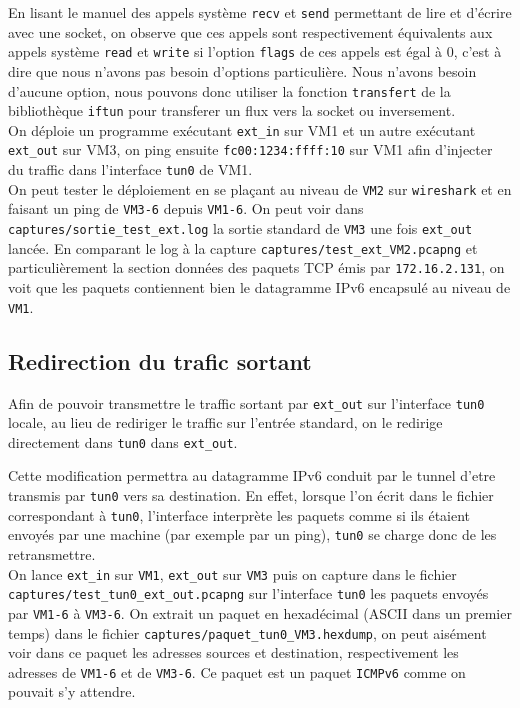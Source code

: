 \documentclass[a4paper, 10pt]{article}
\begin{document}
      En lisant le manuel des appels système \verb+recv+ et \verb+send+
      permettant de lire et d'écrire avec une socket, on observe que ces appels
      sont respectivement équivalents aux appels système \verb+read+ et
      \verb+write+ si l'option \verb+flags+ de ces appels est égal à 0, c'est à
      dire que nous n'avons pas besoin d'options particulière. Nous n'avons
      besoin d'aucune option, nous pouvons donc utiliser la fonction
      \verb+transfert+ de la bibliothèque \verb+iftun+ pour transferer un flux
      vers la socket ou inversement. \\

      On déploie un programme exécutant \verb+ext_in+ sur VM1 et un autre
      exécutant \verb+ext_out+ sur VM3, on ping ensuite \verb+fc00:1234:ffff:10+
      sur VM1 afin d'injecter du traffic dans l'interface \verb+tun0+ de VM1. \\

      On peut tester le déploiement en se plaçant au niveau de \verb+VM2+ sur
      \verb+wireshark+ et en faisant un ping de \verb+VM3-6+ depuis
      \verb+VM1-6+. On peut voir dans \verb+captures/sortie_test_ext.log+ la
      sortie standard de \verb+VM3+ une fois \verb+ext_out+ lancée. En comparant
      le log à la capture \verb+captures/test_ext_VM2.pcapng+ et
      particulièrement la section données des paquets TCP émis par
      \verb+172.16.2.131+, on voit que les paquets contiennent bien le
      datagramme IPv6 encapsulé au niveau de \verb+VM1+.

    \subsection{Redirection du trafic sortant}
      Afin de pouvoir transmettre le traffic sortant par \verb+ext_out+ sur
      l'interface \verb+tun0+ locale, au lieu de rediriger le traffic sur
      l'entrée standard, on le redirige directement dans \verb+tun0+ dans
      \verb+ext_out+.

      Cette modification permettra au datagramme IPv6 conduit par le tunnel
      d'etre transmis par \verb+tun0+ vers sa destination. En effet, lorsque
      l'on écrit dans le fichier correspondant à \verb+tun0+, l'interface
      interprète les paquets comme si ils étaient envoyés par une machine (par
      exemple par un ping), \verb+tun0+ se charge donc de les retransmettre. \\

      On lance \verb+ext_in+ sur \verb+VM1+, \verb+ext_out+ sur \verb+VM3+ puis
      on capture dans le fichier \verb+captures/test_tun0_ext_out.pcapng+ sur
      l'interface \verb+tun0+ les paquets envoyés par \verb+VM1-6+ à
      \verb+VM3-6+. On extrait un paquet en hexadécimal (ASCII dans un premier
      temps) dans le fichier \verb+captures/paquet_tun0_VM3.hexdump+, on peut
      aisément voir dans ce paquet les adresses sources et destination,
      respectivement les adresses de \verb+VM1-6+ et de \verb+VM3-6+. Ce paquet
      est un paquet \verb+ICMPv6+ comme on pouvait s'y attendre. \\
\end{document}
